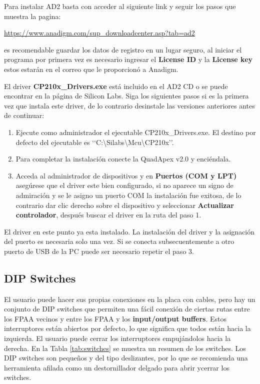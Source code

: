 Para instalar AD2 basta con acceder al siguiente link y seguir los pasos que muestra la pagina:

	\begin{center}
		\url{https://www.anadigm.com/sup_downloadcenter.asp?tab=ad2}
	\end{center}

es recomendable guardar los datos de registro en un lugar seguro, al iniciar el programa por primera vez es necesario ingresar el \textbf{License ID} y la \textbf{License key} estos estarán en el correo que le proporcionó a Anadigm. 

El driver \textbf{CP210x\_{}Drivers.exe} está incluido en el AD2 CD o se puede encontrar en la página de Silicon Labs. Siga los siguientes pasos si es la primera vez que instala este driver, de lo contrario desinstale las versiones anteriores antes de continuar:

\begin{enumerate}
	\item Ejecute como administrador el ejecutable  CP210x\_{}Drivers.exe. El destino por defecto del ejecutable es ‘‘C:\textbackslash{}Silabs\textbackslash{}Mcu\textbackslash{}CP210x’’.
	\item Para completar la instalación conecte la QuadApex v2.0 y enciéndala.
	\item Acceda al administrador de dispositivos y en \textbf{Puertos (COM y LPT)} asegúrese que el driver este bien configurado, si no aparece un signo de admiración y se le asigno un puerto COM  la instalación fue exitosa, de lo contrario dar clic derecho sobre el dispositivo y seleccionar \textbf{Actualizar controlador}, después buscar el  driver en la ruta del paso 1.
\end{enumerate}

El driver en este punto ya esta instalado. La instalación del driver y la asignación del puerto es necesaria solo una vez. Si se conecta subsecuentemente a otro puerto de USB de la PC puede ser necesario repetir el paso 3.

	\subsection{DIP Switches}
	
	El usuario puede hacer sus propias conexiones en la placa con cables, pero hay un conjunto de DIP switches que permiten una fácil conexión de ciertas rutas entre los FPAA vecinos y entre los FPAA y los \textbf{input/output buffers}. Estos interruptores están abiertos por defecto, lo que significa que todos están hacia la izquierda. El usuario puede cerrar los interruptores empujándolos hacia la derecha. En la Tabla \ref{tab:switches} se muestra un resumen de los switches. Los DIP switches son pequeños y del tipo deslizantes, por lo que se recomienda una herramienta afilada como un destornillador delgado para abrir ycerrar los switches.

